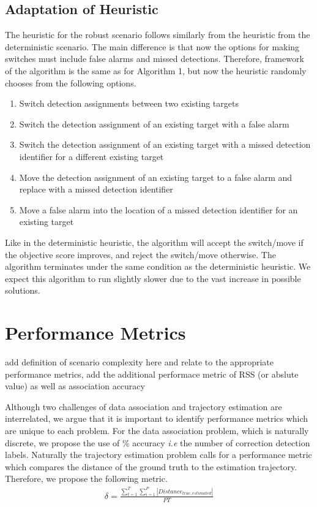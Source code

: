 \documentclass[journal]{IEEEtran}
\begin{document}
\subsection{Adaptation of Heuristic}
The heuristic for the robust scenario follows similarly from the heuristic from the deterministic scenario. The main difference is that now the options for making switches must include false alarms and missed detections. Therefore, framework of the algorithm is the same as for Algorithm 1, but now the heuristic randomly chooses from the following options. 
\begin{enumerate}
  \item Switch detection assignments between two existing targets
  \item Switch the detection assignment of an existing target with a false alarm
  \item Switch the detection assignment of an existing target with a missed detection identifier for a different existing target
  \item Move the detection assignment of an existing target to a false alarm and replace with a missed detection identifier
  \item Move a false alarm into the location of a missed detection identifier for an existing target
\end{enumerate}

Like in the deterministic heuristic, the algorithm will accept the switch/move if the objective score improves, and reject the switch/move otherwise. The algorithm terminates under the same condition as the deterministic heuristic. We expect this algorithm to run slightly slower due to the vast increase in possible solutions. 

\section{Performance Metrics}

{\color{red} add definition of scenario complexity here and relate to the appropriate performance metrics, add the additional performace metric of RSS (or abslute value) as well as association accuracy}

Although two challenges of data association and trajectory estimation are interrelated, we argue that it is important to identify performance metrics which are unique to each problem. For the data association problem, which is naturally discrete, we propose the use of \% accuracy \textit{i.e} the number of correction detection labels. Naturally the trajectory estimation problem calls for a performance metric which compares the distance of the ground truth to the estimation trajectory. Therefore, we propose the following metric. 
\begin{align*}
\delta = \frac{\sum\limits_{t=1}^{T}\sum\limits_{i=1}^{P}|Distance_{true, estimated}|}{PT}
\end{align*}
\end{document}
